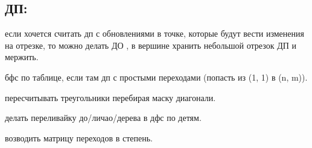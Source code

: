 \subsection{ДП:}
\par если хочется считать дп с обновлениями в точке, которые будут вести изменения на отрезке, то можно делать ДО , в вершине хранить небольшой отрезок ДП и мержить.
\par бфс по таблице, если там дп с простыми переходами (попасть из (1, 1) в (n, m)).
\par пересчитывать треугольники перебирая маску диагонали.
\par делать переливайку до/личао/дерева в дфс по детям.
\par возводить матрицу переходов в степень.


